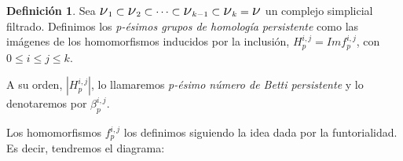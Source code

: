 \documentclass[12pt, a4paper]{article}
\numberwithin{equation}{section}
\theoremstyle{definition}
\newtheorem{defi}{Definición}
\theoremstyle{remark}
\theoremstyle{plain}
\begin{document}
	\begin{defi}
	Sea $ \text{{\Large $\nu$}$_{1}$} 
		\subset \text{{\Large $\nu$}$_{2}$} \subset \cdots \subset
		\text{{\Large $\nu$}$_{k-1}$} \subset 
		\text{{\Large $\nu$}$_{k}$} = \text{{\Large $\nu$}}$ un 
		complejo simplicial filtrado. Definimos los \textit{p-ésimos
		grupos de homología persistente} como las imágenes de los 
		homomorfismos inducidos por la inclusión, $H_{p}^{i,j}=
		Imf_{p}^{i,j}$, con $0\leq i \leq j \leq k$.

		A su orden, $|H_{p}^{i,j}|$, lo llamaremos \textit{p-ésimo 
		número de Betti persistente} y lo denotaremos por 
		$\beta_{p}^{i,j}$.
	\end{defi}

	Los homomorfismos $f_{p}^{i,j}$ los definimos siguiendo la idea dada
	por la funtorialidad. Es decir, tendremos el diagrama:
\end{document}
